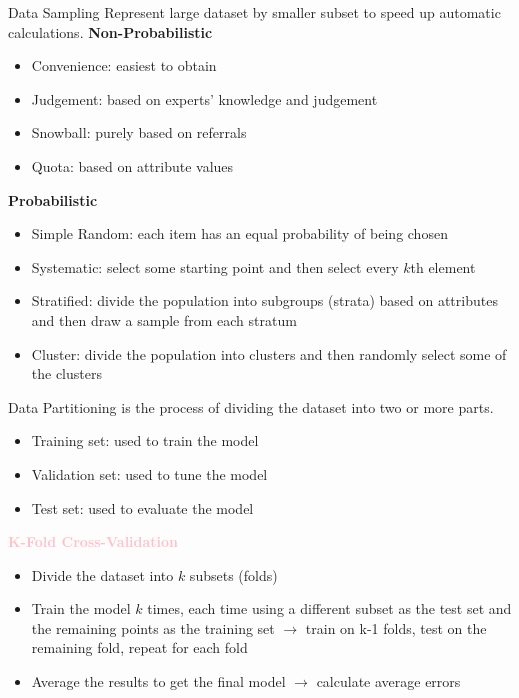 \begin{definition}{Data Sampling}
    Represent large dataset by smaller subset to speed up automatic calculations.
\textbf{Non-Probabilistic}
\begin{itemize}
    \item Convenience: easiest to obtain
    \item Judgement: based on experts' knowledge and judgement
    \item Snowball: purely based on referrals
    \item Quota: based on attribute values
\end{itemize}

\textbf{Probabilistic}
\begin{itemize}
    \item Simple Random: each item has an equal probability of being chosen
    \item Systematic: select some starting point and then select every $k$th element
    \item Stratified: divide the population into subgroups (strata) based on attributes and then draw a sample from each stratum
    \item Cluster: divide the population into clusters and then randomly select some of the clusters
\end{itemize}
\end{definition}

\begin{definition}{Data Partitioning}
    is the process of dividing the dataset into two or more parts.
    \begin{itemize}
        \item Training set: used to train the model
        \item Validation set: used to tune the model
        \item Test set: used to evaluate the model
    \end{itemize}

    \textcolor{pink}{\textbf{K-Fold Cross-Validation}}
    \begin{itemize}
        \item Divide the dataset into $k$ subsets (folds)
        \item Train the model $k$ times, each time using a different subset as the test set and the remaining points as the training set
        $\rightarrow$ train on k-1 folds, test on the remaining fold, repeat for each fold
        \item Average the results to get the final model $\rightarrow$ calculate average errors
    \end{itemize}
\end{definition}

